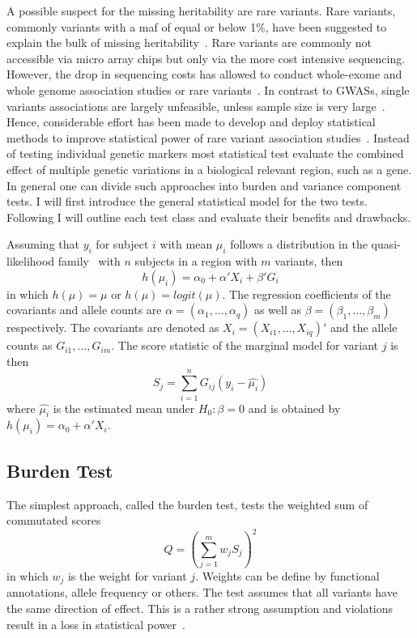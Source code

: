 A possible suspect for the missing heritability are rare variants.
Rare variants, commonly variants with a \acrfull{maf} of equal or below 1\%, have been suggested to explain the bulk of missing heritability~\cite{Jiang2013,Li2009a}.
Rare variants are commonly not accessible via micro array chips but only via the more cost intensive sequencing.
However, the drop in sequencing costs has allowed to conduct whole-exome and whole genome association studies or rare variants~\cite{Goodwin2016}.
In contrast to GWASs, single variants associations are largely unfeasible, unless sample size is very large~\cite{Lee2014}.
Hence, considerable effort has been made to develop and deploy statistical methods to improve statistical power of rare variant association studies~\cite{Morris2010,Zeng2014,Daye2012,Manuscript2013}.
Instead of testing individual genetic markers most statistical test evaluate the combined effect of multiple genetic variations in a biological relevant region, such as a gene.
In general one can divide such approaches into burden and variance component tests.
I will first introduce the general statistical model for the two tests.
Following I will outline each test class and evaluate their benefits and drawbacks.

Assuming that $y_i$ for subject $i$ with mean $\mu_i$ follows a distribution in the quasi-likelihood family~\cite{Lee2014} with $n$ subjects in a region with $m$ variants, then
\begin{equation}
  h(\mu_i) = \alpha_0 + \alpha'X_i +\beta'G_i
\end{equation}
in which $h(\mu) = \mu$ or $h(\mu) = logit(\mu)$.
The regression coefficients of the covariants and allele counts are $\alpha = (\alpha_1, \ldots, \alpha_q)$ as well as $\beta = (\beta_1, \ldots, \beta_m)$ respectively.
The covariants are denoted as $X_i = (X_{i1}, \ldots, X_{iq})'$ and the allele counts as $G_{i1}, \ldots, G_{im}$.
The score statistic of the marginal model for variant $j$ is then
\begin{equation}
  S_j = \sum^n_{i=1} G_{ij}(y_i-\hat{\mu_i})
\end{equation}
where $\hat{\mu_i}$ is the estimated mean under $H_0: \beta = 0 $ and is obtained by $h(\mu_i) = \alpha_0 + \alpha'X_i$.

\subsection{Burden Test}
\label{sub:burden_test}
The simplest approach, called the burden test, tests the weighted sum of commutated scores
\begin{equation}\label{eq:burden}
  Q = {(\sum^{m}_{j=1} w_{j} S_{j})}^2
\end{equation}
in which $w_j$ is the weight for variant $j$.
Weights can be define by functional annotations, allele frequency or others.
The test assumes that all variants  have the same direction of effect.
This is a rather strong assumption and violations result in a loss in statistical power~\cite{Derkach2013a}.

